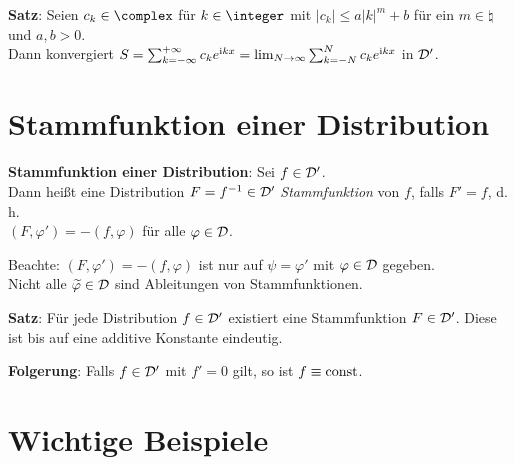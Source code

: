 \textbf{Satz}:
Seien $c_k \in \complex$ für $k \in \integer$ mit
$|c_k| \le a |k|^m + b$ für ein $m \in \natural$ und $a, b > 0$.\\
Dann konvergiert $S = \sum_{k=-\infty}^{+\infty} c_k e^{\mathrm{i} kx} =
\lim_{N \to \infty} \sum_{k=-N}^N c_k e^{\mathrm{i} kx}$ in $\mathcal{D}'$.

\section{%
    Stammfunktion einer Distribution%
}

\textbf{Stammfunktion einer Distribution}:
Sei $f \in \mathcal{D}'$.\\
Dann heißt eine Distribution $F = f^{-1} \in \mathcal{D}'$
\emph{Stammfunktion} von $f$, falls $F' = f$, d.\,h.\\
$(F, \varphi') = -(f, \varphi)$ für alle $\varphi \in \mathcal{D}$.

Beachte:
$(F, \varphi') = -(f, \varphi)$ ist nur auf $\psi = \varphi'$ mit
$\varphi \in \mathcal{D}$ gegeben.\\
Nicht alle $\widetilde{\varphi} \in \mathcal{D}$ sind Ableitungen von Stammfunktionen.

\textbf{Satz}:
Für jede Distribution $f \in \mathcal{D}'$ existiert eine Stammfunktion $F \in \mathcal{D}'$.
Diese ist bis auf eine additive Konstante eindeutig.

\textbf{Folgerung}:
Falls $f \in \mathcal{D}'$ mit $f' = 0$ gilt, so ist $f \equiv \operatorname{const}$.

\pagebreak

\section{%
    Wichtige Beispiele%
}

